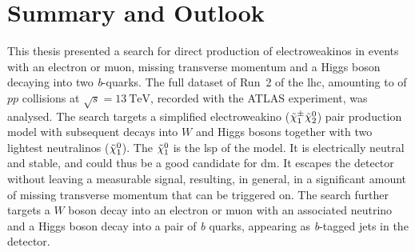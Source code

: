 

\chapter{Summary and Outlook}\label{ch:summary}
\glsresetall
\graphicspath{{chapter-summary/Figs/Vector/}{chapter-summary/Figs/}}

This thesis presented a search for direct production of electroweakinos in events with an electron or muon, missing transverse momentum and a Higgs boson decaying into two \textit{b}-quarks.
The full dataset of Run~2 of the \gls{lhc}, amounting to \onethirtynineifb of $pp$ collisions at $\sqrt{s} = \SI{13}{\TeV}$, recorded with the ATLAS experiment, was analysed.
The search targets a simplified electroweakino ($\tilde{\chi}_1^\pm\tilde{\chi}_2^0$) pair production model with subsequent decays into $W$ and Higgs bosons together with two lightest neutralinos ($\tilde{\chi}_1^0$). The $\tilde{\chi}_1^0$ is the \gls{lsp} of the model. It is electrically neutral and stable, and could thus be a good candidate for \gls{dm}.
It escapes the detector without leaving a measurable signal, resulting, in general, in a significant amount of missing transverse momentum that can be triggered on.
The search further targets a $W$ boson decay into an electron or muon with an associated neutrino and a Higgs boson decay into a pair of \textit{b} quarks, appearing as \textit{b}-tagged jets in the detector.

